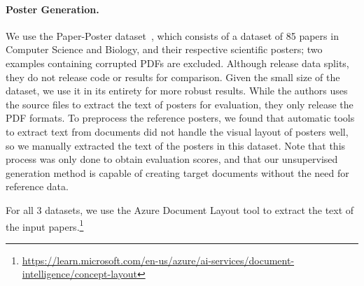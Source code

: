 
\paragraph{Poster Generation.} We use the Paper-Poster dataset~\cite{Qiang2016LearningTG}, which consists of a dataset of 85 papers in Computer Science and Biology, and their respective scientific posters; two examples containing corrupted PDFs are excluded. Although \textcite{Qiang2016LearningTG} release data splits, they do not release code or results for comparison. Given the small size of the dataset, we use it in its entirety for more robust results. While the authors uses the source files to extract the text of posters for evaluation, they only release the PDF formats. To preprocess the reference posters, we found that automatic tools to extract text from documents did not handle the visual layout of posters well, so we manually extracted the text of the posters in this dataset. Note that this process was only done to obtain evaluation scores, and that our unsupervised generation method is capable of creating target documents without the need for reference data.%


For all 3 datasets, we use the Azure Document Layout tool to extract the text of the input papers.\footnote{\scriptsize \url{https://learn.microsoft.com/en-us/azure/ai-services/document-intelligence/concept-layout}}





